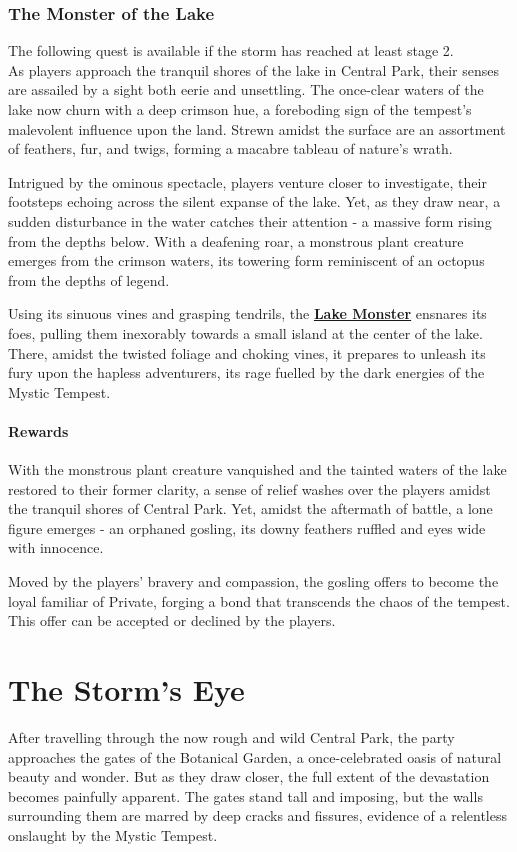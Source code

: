 \hfill\eject

\subsubsection*{The Monster of the Lake}
The following quest is available if the storm has reached at least stage 2.\\
As players approach the tranquil shores of the lake in Central Park, their senses are assailed by a sight both eerie and unsettling. The once-clear waters of the lake now churn with a deep crimson hue, a foreboding sign of the tempest's malevolent influence upon the land. Strewn amidst the surface are an assortment of feathers, fur, and twigs, forming a macabre tableau of nature's wrath.

Intrigued by the ominous spectacle, players venture closer to investigate, their footsteps echoing across the silent expanse of the lake. Yet, as they draw near, a sudden disturbance in the water catches their attention - a massive form rising from the depths below. With a deafening roar, a monstrous plant creature emerges from the crimson waters, its towering form reminiscent of an octopus from the depths of legend.

Using its sinuous vines and grasping tendrils, the \hyperref[sec:LakeMonster]{\textbf{Lake Monster}} ensnares its foes, pulling them inexorably towards a small island at the center of the lake. There, amidst the twisted foliage and choking vines, it prepares to unleash its fury upon the hapless adventurers, its rage fuelled by the dark energies of the Mystic Tempest.

\paragraph*{Rewards}
With the monstrous plant creature vanquished and the tainted waters of the lake restored to their former clarity, a sense of relief washes over the players amidst the tranquil shores of Central Park. Yet, amidst the aftermath of battle, a lone figure emerges - an orphaned gosling, its downy feathers ruffled and eyes wide with innocence.

Moved by the players' bravery and compassion, the gosling offers to become the loyal familiar of Private, forging a bond that transcends the chaos of the tempest. This offer can be accepted or declined by the players.
\vspace*{-1.8\fontdimen6\font}\\
\section*{The Storm's Eye}
After travelling through the now rough and wild Central Park, the party approaches the gates of the Botanical Garden, a once-celebrated oasis of natural beauty and wonder. But as they draw closer, the full extent of the devastation becomes painfully apparent. The gates stand tall and imposing, but the walls surrounding them are marred by deep cracks and fissures, evidence of a relentless onslaught by the Mystic Tempest.

